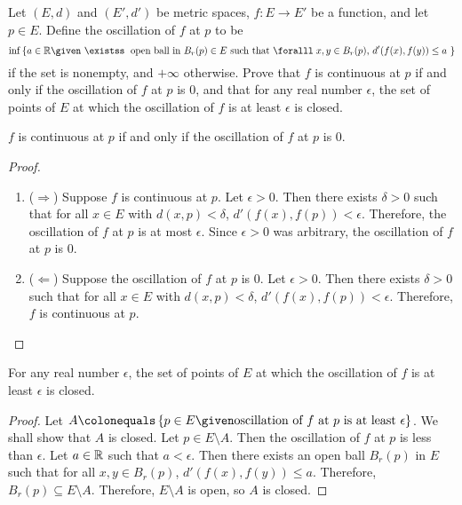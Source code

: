 \begin{problem}
  Let $(E, d)$ and $(E', d')$ be metric spaces, $f : E \to E'$ be a function,
  and let $p \in E$. Define the oscillation of $f$ at $p$ to be
  \[
    \inf \set{
      a \in \R \given
      \text{
        $\exists$ open ball in $B_r(p) \in E$
        such that $\forall x, y \in B_r(p)$,
        $d'(f(x), f(y)) \leq a$
      }
    } \]
    if the set is nonempty, and $+\infty$ otherwise.
    Prove that $f$ is continuous at $p$ if and only if the oscillation of $f$ at $p$ is $0$,
    and that for any real number $\epsilon$, the set of points of $E$
    at which the oscillation of $f$ is at least $\epsilon$ is closed.
\end{problem}
\begin{answer}
  \begin{claim}
    $f$ is continuous at $p$ if and only if the oscillation of $f$ at $p$ is $0$.
    \begin{proof}
      \begin{enumerate}
        \item ($\Rightarrow$)
          Suppose $f$ is continuous at $p$.
          Let $\epsilon > 0$.
          Then there exists $\delta > 0$ such that
          for all $x \in E$ with $d(x, p) < \delta$,
          $d'(f(x), f(p)) < \epsilon$.
          Therefore, the oscillation of $f$ at $p$ is at most $\epsilon$.
          Since $\epsilon > 0$ was arbitrary, the oscillation of $f$ at $p$ is $0$.
        \item ($\Leftarrow$)
          Suppose the oscillation of $f$ at $p$ is $0$.
          Let $\epsilon > 0$.
          Then there exists $\delta > 0$ such that
          for all $x \in E$ with $d(x, p) < \delta$,
          $d'(f(x), f(p)) < \epsilon$.
          Therefore, $f$ is continuous at $p$.
      \end{enumerate}
    \end{proof}
  \end{claim}

  \begin{claim}
    For any real number $\epsilon$, the set of points of $E$
    at which the oscillation of $f$ is at least $\epsilon$ is closed.
    \begin{proof}
      Let $A \colonequals \set{p \in E \given \text{oscillation of $f$ at $p$ is at least $\epsilon$}}$.
      We shall show that $A$ is closed.
      Let $p \in E \setminus A$.
      Then the oscillation of $f$ at $p$ is less than $\epsilon$.
      Let $a \in \mathbb{R}$ such that $a < \epsilon$.
      Then there exists an open ball $B_r(p)$ in $E$ such that
      for all $x, y \in B_r(p)$, $d'(f(x), f(y)) \leq a$.
      Therefore, $B_r(p) \subseteq E \setminus A$.
      Therefore, $E \setminus A$ is open, so $A$ is closed.
    \end{proof}
  \end{claim}
\end{answer}
